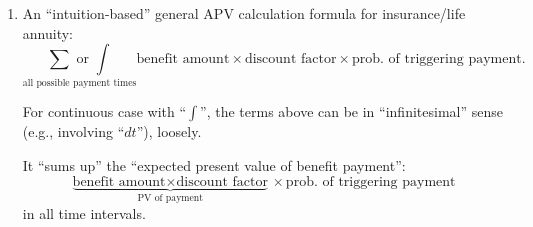 \begin{enumerate}
\item
\label{it:gen-APV-fmla}
\ystar An ``intuition-based'' general APV calculation formula for
insurance/life annuity:
\[
\underset{\text{all possible payment times}}{\sum\text{ or }\int}\text{benefit amount}\times\text{discount
factor}\times\text{prob.\ of triggering payment}.
\]
\begin{note}
For continuous case with ``\(\int\)'', the terms above can be in
``infinitesimal'' sense (e.g., involving ``\(dt\)''), loosely.
\end{note}


\begin{intuition}
It ``sums up'' the ``expected present value of benefit payment'':
\[
\underbrace{\text{benefit amount}\times\text{discount factor}}_{\text{PV of payment}}
\times\text{prob.\ of triggering payment}
\]
in all time intervals.
\end{intuition}
\end{enumerate}

